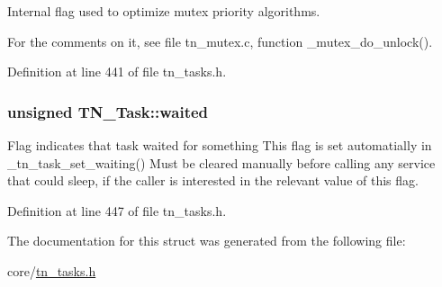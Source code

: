 Internal flag used to optimize mutex priority algorithms. 

For the comments on it, see file tn\+\_\+mutex.\+c, function {\ttfamily \+\_\+mutex\+\_\+do\+\_\+unlock()}. 

Definition at line 441 of file tn\+\_\+tasks.\+h.

\hypertarget{structTN__Task_a47c3a0a27be1ee526a1599a2ca8bb269}{
\subsubsection[{waited}]{\setlength{\rightskip}{0pt plus 5cm}unsigned T\+N\+\_\+\+Task\+::waited}}\label{structTN__Task_a47c3a0a27be1ee526a1599a2ca8bb269}


Flag indicates that task waited for something This flag is set automatially in {\ttfamily \+\_\+tn\+\_\+task\+\_\+set\+\_\+waiting()} Must be cleared manually before calling any service that could sleep, if the caller is interested in the relevant value of this flag. 



Definition at line 447 of file tn\+\_\+tasks.\+h.



The documentation for this struct was generated from the following file\+:\begin{DoxyCompactItemize}
\item 
core/\hyperlink{tn__tasks_8h}{tn\+\_\+tasks.\+h}\end{DoxyCompactItemize}
